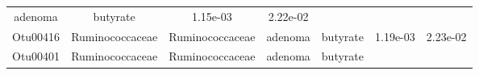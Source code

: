 \documentclass[11pt,]{article}
\begin{document}
\begin{longtable}[]{@{}ccccccc@{}}
\begin{minipage}[t]{0.09\columnwidth}
adenoma\strut
\end{minipage} & \begin{minipage}[t]{0.11\columnwidth}\centering\strut
butyrate\strut
\end{minipage} & \begin{minipage}[t]{0.09\columnwidth}\centering\strut
1.15e-03\strut
\end{minipage} & \begin{minipage}[t]{0.09\columnwidth}\centering\strut
2.22e-02\strut
\end{minipage}\tabularnewline
\begin{minipage}[t]{0.09\columnwidth}\centering\strut
Otu00416\strut
\end{minipage} & \begin{minipage}[t]{0.17\columnwidth}\centering\strut
Ruminococcaceae\strut
\end{minipage} & \begin{minipage}[t]{0.17\columnwidth}\centering\strut
Ruminococcaceae\strut
\end{minipage} & \begin{minipage}[t]{0.09\columnwidth}\centering\strut
adenoma\strut
\end{minipage} & \begin{minipage}[t]{0.11\columnwidth}\centering\strut
butyrate\strut
\end{minipage} & \begin{minipage}[t]{0.09\columnwidth}\centering\strut
1.19e-03\strut
\end{minipage} & \begin{minipage}[t]{0.09\columnwidth}\centering\strut
2.23e-02\strut
\end{minipage}\tabularnewline
\begin{minipage}[t]{0.09\columnwidth}\centering\strut
Otu00401\strut
\end{minipage} & \begin{minipage}[t]{0.17\columnwidth}\centering\strut
Ruminococcaceae\strut
\end{minipage} & \begin{minipage}[t]{0.17\columnwidth}\centering\strut
Ruminococcaceae\strut
\end{minipage} & \begin{minipage}[t]{0.09\columnwidth}\centering\strut
adenoma\strut
\end{minipage} & \begin{minipage}[t]{0.11\columnwidth}\centering\strut
butyrate\strut
\end{minipage} & \begin{minipage}[t]{0.09\columnwidth}\centering\strut

\end{minipage}
\end{longtable}
\end{document}
